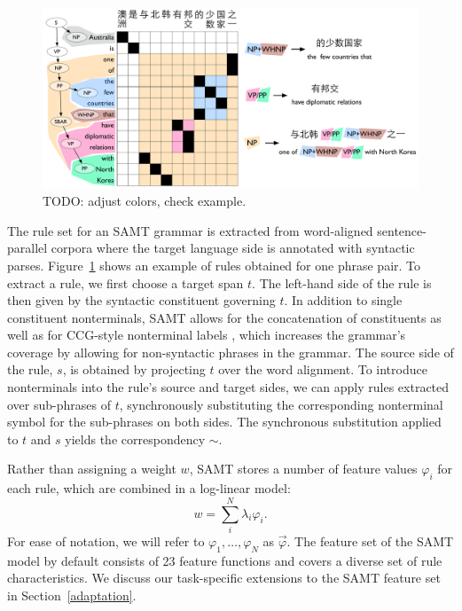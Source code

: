 \documentclass[11pt]{article}
\newcommand{\mnote}[1]{\marginpar{%
  \vskip-\baselineskip
  \raggedright\footnotesize
  \itshape\hrule\smallskip\footnotesize{#1}\par\smallskip\hrule}}
\begin{document}
\begin{figure}[t]
\begin{center}
\includegraphics[width=0.99\linewidth]{figures/scfg_grid_revamp.pdf}
\end{center}
\caption{TODO: adjust colors, check example.}
\label{samt_extraction}
\end{figure}

The rule set for an SAMT grammar is extracted from word-aligned
sentence-parallel corpora where the target language side is annotated
with syntactic parses. Figure~\ref{samt_extraction} shows an example
of rules obtained for one phrase pair. To extract a rule, we first
choose a target span $t$. The left-hand side of the rule is then given
by the syntactic constituent governing $t$. In addition to single
constituent nonterminals, SAMT allows for the concatenation of
constituents as well as for CCG-style nonterminal labels
\cite{Steedman1999}, which increases the grammar's coverage by
allowing for non-syntactic phrases in the grammar. The source side of
the rule, $s$, is obtained by projecting $t$ over the word
alignment. To introduce nonterminals into the rule's source and
target sides, we can apply rules extracted over sub-phrases of $t$,
synchronously substituting the corresponding nonterminal symbol for
the sub-phrases on both sides. \mnote{Tie this back to $\alpha$ and
  $\gamma$?} The synchronous substitution applied to $t$ and $s$
yields the correspondency $\sim$.

Rather than assigning a weight $w$, SAMT stores a number of feature
values $\varphi_i$ for each rule, which are combined in a log-linear
model:
\begin{equation}
  w = \sum_i^N \lambda_i \varphi_i .
\end{equation}
For ease of notation, we will refer to $\varphi_1, \ldots ,\varphi_N$
as $\vec{\varphi}$. The feature set of the SAMT model by default
consists of 23 feature functions and covers a diverse set of rule
characteristics. We discuss our task-specific extensions to the SAMT
feature set in Section~\ref{adaptation}.
\end{document}
